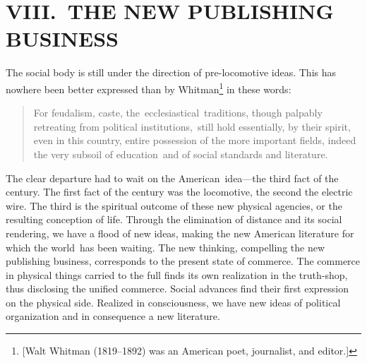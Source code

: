 \documentclass[openany,nobib]{tufte-book}
\begin{document}
\hypertarget{viii-the-new-publishing-business}{%
\section{VIII.~THE NEW PUBLISHING
BUSINESS~}\label{viii-the-new-publishing-business}}

The social body is still under the direction of pre-locomotive ideas.
This has nowhere been better expressed than by Whitman\footnote{{[}Walt
  Whitman (1819--1892) was an American poet, journalist, and editor.{]}}
in these words:

\begin{quote}
For feudalism, caste, the~ecclesiastical~traditions, though palpably
retreating from political institutions,~still hold essentially, by their
spirit, even in this country, entire possession of the more important
fields, indeed the very subsoil of education~and of social standards and
literature.
\end{quote}

\noindent The clear departure had to wait on the American~idea---the third fact of
the century. The first fact of the century was the locomotive, the
second the electric wire. The third is the spiritual outcome of these
new physical agencies, or the resulting conception of life. Through the
elimination of distance and its social rendering, we have a flood of new
ideas, making the new American literature for which the world~has been
waiting. The new thinking, compelling the new publishing business,
corresponds to the present state of commerce. The commerce in physical
things carried to the full finds its own realization in the truth-shop,
thus disclosing the unified commerce. Social advances find their first
expression on the physical side. Realized in consciousness, we have new
ideas of political organization and in consequence a new literature.~
\end{document}
